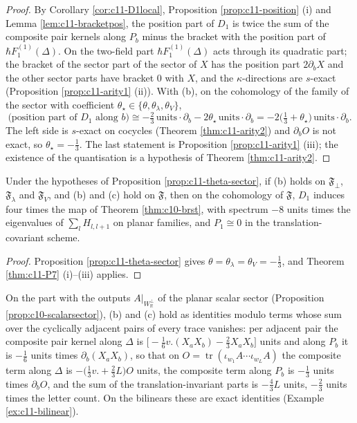 \begin{proof}
By Corollary \ref{cor:c11-D1local}, Proposition \ref{prop:c11-position} (i) and Lemma \ref{lem:c11-bracketpos}, the position part of $D_1$ is twice the sum of the composite pair kernels along $P_b$ minus the bracket with the position part of $\hbar F_1^{(1)}(\Delta)$. On the two-field part $\hbar F_1^{(1)}(\Delta)$ acts through its quadratic part; the bracket of the sector part of the sector of $X$ has the position part $2\partial_bX$ and the other sector parts have bracket $0$ with $X$, and the $\kappa$-directions are $s$-exact (Proposition \ref{prop:c11-arity1} (ii)). With (b), on the cohomology of the family of the sector with coefficient $\theta_\star\in\{\theta,\theta_\lambda,\theta_V\}$,
\[
\big(\text{position part of }D_1\text{ along }b\big)\cong-\tfrac23\,\text{units}\cdot\partial_b-2\theta_\star\,\text{units}\cdot\partial_b=-2\big(\tfrac13+\theta_\star\big)\,\text{units}\cdot\partial_b .
\]
The left side is $s$-exact on cocycles (Theorem \ref{thm:c11-arity2}) and $\partial_bO$ is not exact, so $\theta_\star=-\tfrac13$. The last statement is Proposition \ref{prop:c11-arity1} (iii); the existence of the quantisation is a hypothesis of Theorem \ref{thm:c11-arity2}.
\end{proof}

\begin{corollary}
\label{cor:c11-noA}
Under the hypotheses of Proposition \ref{prop:c11-theta-sector}, if (b) holds on $\mathfrak F_\perp$, $\mathfrak F_\lambda$ and $\mathfrak F_V$, and (b) and (c) hold on $\mathfrak F$, then on the cohomology of $\mathfrak F$, $D_1$ induces four times the map of Theorem \ref{thm:c10-brst}, with spectrum $-8$ units times the eigenvalues of $\sum_lH_{l,l+1}$ on planar families, and $P_1\cong0$ in the translation-covariant scheme.
\end{corollary}

\begin{proof}
Proposition \ref{prop:c11-theta-sector} gives $\theta=\theta_\lambda=\theta_V=-\tfrac13$, and Theorem \ref{thm:c11-P7} (i)--(iii) applies.
\end{proof}

\begin{proposition}
\label{prop:c11-scalar}
On the part with the outputs $A|_{W_{\mathbb R}^\perp}$ of the planar scalar sector (Proposition \ref{prop:c10-scalarsector}), (b) and (c) hold as identities modulo terms whose sum over the cyclically adjacent pairs of every trace vanishes: per adjacent pair the composite pair kernel along $\Delta$ is $\big[-\tfrac16v.(X_aX_b)-\tfrac23X_aX_b\big]$ units and along $P_b$ it is $-\tfrac16$ units times $\partial_b(X_aX_b)$, so that on $O=\operatorname{tr}(\iota_{w_1}A\cdots\iota_{w_L}A)$ the composite term along $\Delta$ is $-\big(\tfrac13v.+\tfrac23L\big)O$ units, the composite term along $P_b$ is $-\tfrac13$ units times $\partial_bO$, and the sum of the translation-invariant parts is $-\tfrac43L$ units, $-\tfrac23$ units times the letter count. On the bilinears these are exact identities (Example \ref{ex:c11-bilinear}).
\end{proposition}

